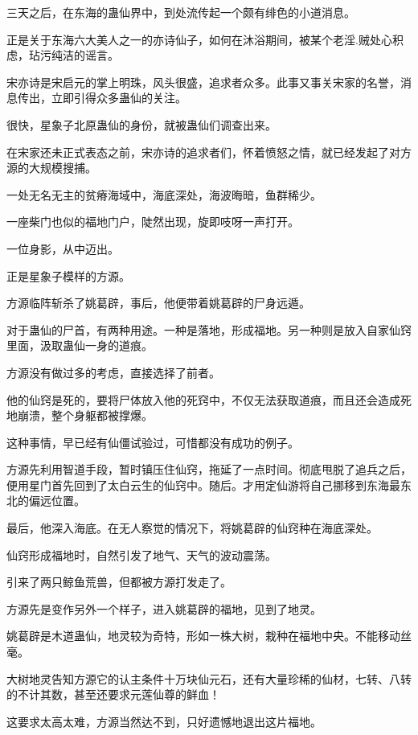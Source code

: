 
\begin{this_body}

三天之后，在东海的蛊仙界中，到处流传起一个颇有绯色的小道消息。

正是关于东海六大美人之一的亦诗仙子，如何在沐浴期间，被某个老淫.贼处心积虑，玷污纯洁的谣言。

宋亦诗是宋启元的掌上明珠，风头很盛，追求者众多。此事又事关宋家的名誉，消息传出，立即引得众多蛊仙的关注。

很快，星象子北原蛊仙的身份，就被蛊仙们调查出来。

在宋家还未正式表态之前，宋亦诗的追求者们，怀着愤怒之情，就已经发起了对方源的大规模搜捕。

一处无名无主的贫瘠海域中，海底深处，海波晦暗，鱼群稀少。

一座柴门也似的福地门户，陡然出现，旋即吱呀一声打开。

一位身影，从中迈出。

正是星象子模样的方源。

方源临阵斩杀了姚葛辟，事后，他便带着姚葛辟的尸身远遁。

对于蛊仙的尸首，有两种用途。一种是落地，形成福地。另一种则是放入自家仙窍里面，汲取蛊仙一身的道痕。

方源没有做过多的考虑，直接选择了前者。

他的仙窍是死的，要将尸体放入他的死窍中，不仅无法获取道痕，而且还会造成死地崩溃，整个身躯都被撑爆。

这种事情，早已经有仙僵试验过，可惜都没有成功的例子。

方源先利用智道手段，暂时镇压住仙窍，拖延了一点时间。彻底甩脱了追兵之后，便用星门首先回到了太白云生的仙窍中。随后。才用定仙游将自己挪移到东海最东北的偏远位置。

最后，他深入海底。在无人察觉的情况下，将姚葛辟的仙窍种在海底深处。

仙窍形成福地时，自然引发了地气、天气的波动震荡。

引来了两只鲸鱼荒兽，但都被方源打发走了。

方源先是变作另外一个样子，进入姚葛辟的福地，见到了地灵。

姚葛辟是木道蛊仙，地灵较为奇特，形如一株大树，栽种在福地中央。不能移动丝毫。

大树地灵告知方源它的认主条件十万块仙元石，还有大量珍稀的仙材，七转、八转的不计其数，甚至还要求元莲仙尊的鲜血！

这要求太高太难，方源当然达不到，只好遗憾地退出这片福地。


\end{this_body}
